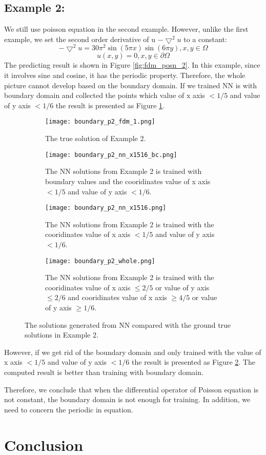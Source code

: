 \documentclass{article}
\begin{document}
\subsection{Example 2: }
We still use poisson equation in the second example. However, unlike the first example,  we set the second order derivative of u $-\bigtriangledown^{2} u$ to a constant:
\[ -\bigtriangledown^{2} u = 30\pi^2\sin(5\pi x)\sin(6 \pi y), x,y \in\Omega \]
\[u(x,y) = 0, x,y \in \partial \Omega \]
The predicting result is shown in Figure \ref{fig:fdm_posn_2}.
In this example, since it involves sine and cosine, it has the periodic property. 
Therefore, the whole picture cannot develop based on the boundary domain. 
If we trained NN is with boundary domain and collected the points which value of x axis $<1/5$ and value of y axis $< 1/6$ the result is presented as Figure \ref{fig:fdm_posn_2_1}. 
\begin{figure}[h]
	\begin{subfigure}{0.5\textwidth}
		\texttt{[image: boundary\_p2\_fdm\_1.png]}
		\caption{The true solution of Example 2.}
	\end{subfigure}
	\begin{subfigure}{0.5\textwidth}
		\texttt{[image: boundary\_p2\_nn\_x1516\_bc.png]}
		\caption{The NN solutions from Example 2 is trained with boundary values and the cooridinates value of x axis $< 1/5$ and value of y axis $< 1/6$.}
		\label{fig:fdm_posn_2_1}
	\end{subfigure}
	 \begin{subfigure}{0.5\textwidth}
	 	\texttt{[image: boundary\_p2\_nn\_x1516.png]}
	 	\caption{The NN solutions from Example 2 is trained with the cooridinates value of x axis $<1/5$ and value of y axis $< 1/6$.}
	 	 
	 	\label{fig:fdm_posn_2_2}
	 \end{subfigure}
  \begin{subfigure}{0.5\textwidth}
 	\texttt{[image: boundary\_p2\_whole.png]}
 	\caption{The NN solutions from Example 2 is trained with the cooridinates value of x axis $ \leq 2/5$ or value of y axis $\leq 2/6$ and cooridinates value of x axis $ \geq 4/5$ or value of y axis $\geq 1/6$.}
 	
 	\label{fig:fdm_posn_2_3}
 \end{subfigure}
 \caption{The solutions generated from NN compared with the ground true solutions in Example 2. }
\end{figure}
However, if we get rid of the boundary domain and only trained with the  value of x axis $<1/5$ and value of y axis $< 1/6$ the result is presented as Figure \ref{fig:fdm_posn_2_2}. The computed result is better than training with boundary domain. 

Therefore, we conclude that when the differential operator of Poisson equation is not constant, the boundary domain is not enough for training.
In addition, we need to concern the periodic in equation. 


\section{Conclusion}









\end{document}

